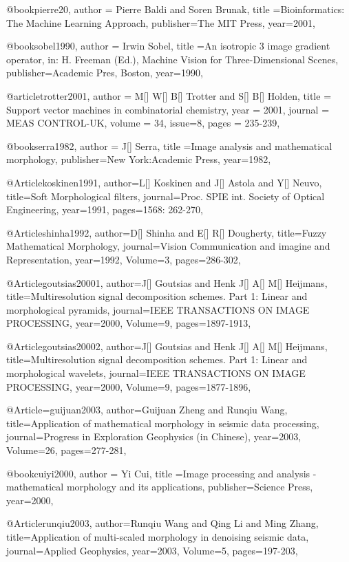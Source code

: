 @book{pierre20,
  author = {Pierre Baldi and Soren Brunak},
  title ={Bioinformatics: The Machine Learning Approach},
  publisher={The MIT Press},
  year=2001,
}


@book{sobel1990,
  author = {Irwin Sobel},
  title ={An isotropic 3 image gradient operator, in: H. Freeman (Ed.), Machine Vision for Three-Dimensional Scenes},
  publisher={Academic Pres, Boston},
  year=1990,
}


@article{trotter2001,
author = {M[] W[] B[] Trotter and S[] B[] Holden},
title = {Support vector machines in combinatorial chemistry},
year = {2001},
journal = {MEAS CONTROL-UK},
volume = {34},
issue=8,
pages = {235-239},
}

@book{serra1982,
  author = {J[] Serra},
  title ={Image analysis and mathematical morphology},
  publisher={New York:Academic Press},
  year=1982,
}

@Article{koskinen1991,
  author={L[] Koskinen and J[] Astola and Y[] Neuvo},
  title={Soft Morphological filters},
  journal={Proc. SPIE int. Society of Optical Engineering},
  year=1991,
  pages={1568: 262-270},
}

@Article{shinha1992,
  author={D[] Shinha and E[] R[] Dougherty},
  title={Fuzzy Mathematical Morphology},
  journal={Vision Communication and imagine and Representation},
  year=1992,
  Volume=3,
  pages={286-302},
}

@Article{goutsias20001,
  author={J[] Goutsias and Henk J[] A[] M[] Heijmans},
  title={Multiresolution signal decomposition schemes. Part 1: Linear and morphological pyramids},
  journal={IEEE TRANSACTIONS ON IMAGE PROCESSING},
  year=2000,
  Volume=9,
  pages={1897-1913},
}

@Article{goutsias20002,
  author={J[] Goutsias and Henk J[] A[] M[] Heijmans},
  title={Multiresolution signal decomposition schemes. Part 1: Linear and morphological wavelets},
  journal={IEEE TRANSACTIONS ON IMAGE PROCESSING},
  year=2000,
  Volume=9,
  pages={1877-1896},
}

@Article={guijuan2003,
  author={Guijuan Zheng and Runqiu Wang},
  title={Application of mathematical morphology in seismic data processing},
  journal={Progress in Exploration Geophysics (in Chinese)},
  year=2003,
  Volume=26,
  pages={277-281},
}

@book{cuiyi2000,
  author = {Yi Cui},
  title ={Image processing and analysis - mathematical morphology and its applications},
  publisher={Science Press},
  year=2000,
}


@Article{runqiu2003,
  author={Runqiu Wang and Qing Li and Ming Zhang},
  title={Application of multi-scaled morphology in denoising seismic data},
  journal={Applied Geophysics},
  year=2003,
  Volume=5,
  pages={197-203},
}

